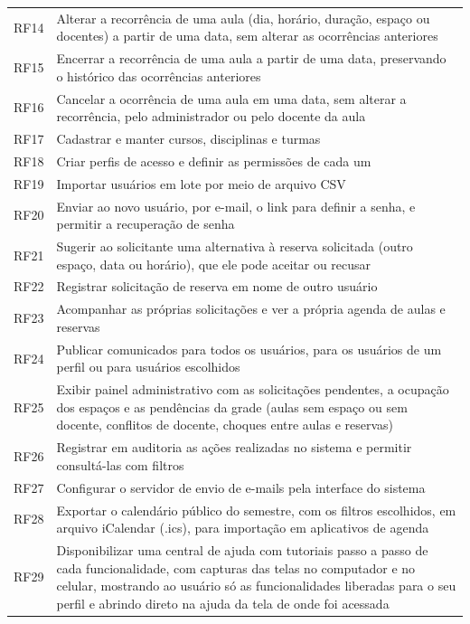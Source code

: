 \documentclass[
	12pt,				%
	twoside,			%
	openany,			%
	a4paper,			%
	chapter=TITLE,		%
	section=TITLE,		%
	subsection=TITLE,	%
	subsubsection=TITLE,%
	english,			%
	french,				%
	spanish,			%
	brazil,				%
	]{abntex2}
\begin{document}
\begin{SingleSpace}
\begin{longtable}{@{}p{1.8cm}p{12cm}@{}}
	RF14 & Alterar a recorrência de uma aula (dia, horário, duração, espaço ou docentes) a partir de uma data, sem alterar as ocorrências anteriores \\
	RF15 & Encerrar a recorrência de uma aula a partir de uma data, preservando o histórico das ocorrências anteriores \\
	RF16 & Cancelar a ocorrência de uma aula em uma data, sem alterar a recorrência, pelo administrador ou pelo docente da aula \\
	RF17 & Cadastrar e manter cursos, disciplinas e turmas \\
	RF18 & Criar perfis de acesso e definir as permissões de cada um \\
	RF19 & Importar usuários em lote por meio de arquivo CSV \\
	RF20 & Enviar ao novo usuário, por e-mail, o link para definir a senha, e permitir a recuperação de senha \\
	RF21 & Sugerir ao solicitante uma alternativa à reserva solicitada (outro espaço, data ou horário), que ele pode aceitar ou recusar \\
	RF22 & Registrar solicitação de reserva em nome de outro usuário \\
	RF23 & Acompanhar as próprias solicitações e ver a própria agenda de aulas e reservas \\
	RF24 & Publicar comunicados para todos os usuários, para os usuários de um perfil ou para usuários escolhidos \\
	RF25 & Exibir painel administrativo com as solicitações pendentes, a ocupação dos espaços e as pendências da grade (aulas sem espaço ou sem docente, conflitos de docente, choques entre aulas e reservas) \\
	RF26 & Registrar em auditoria as ações realizadas no sistema e permitir consultá-las com filtros \\
	RF27 & Configurar o servidor de envio de e-mails pela interface do sistema \\
	RF28 & Exportar o calendário público do semestre, com os filtros escolhidos, em arquivo iCalendar (.ics), para importação em aplicativos de agenda \\
	RF29 & Disponibilizar uma central de ajuda com tutoriais passo a passo de cada funcionalidade, com capturas das telas no computador e no celular, mostrando ao usuário só as funcionalidades liberadas para o seu perfil e abrindo direto na ajuda da tela de onde foi acessada \\
\end{longtable}
\end{SingleSpace}
\end{document}
